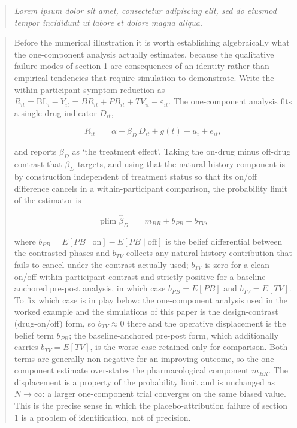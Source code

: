 \documentclass[
  11pt,
]{article}
\newenvironment{rgt}{%
  \begin{quote}\small\itshape\color[RGB]{20,60,160}}{%
  \end{quote}}
\newenvironment{orig}{%
  \begin{quote}\normalsize\color[gray]{0.55}}{%
  \end{quote}}
\begin{document}
\begin{rgt}
Lorem ipsum dolor sit amet, consectetur adipiscing elit, sed do eiusmod tempor incididunt ut labore et dolore magna aliqua.

\end{rgt}

\begin{orig}
Before the numerical illustration it is worth establishing
algebraically what the one-component analysis actually estimates,
because the qualitative failure modes of section 1 are
consequences of an identity rather than empirical tendencies that
require simulation to demonstrate. Write the within-participant
symptom reduction as
\(R_{it} = \mathrm{BL}_i - Y_{it} = BR_{it} + PB_{it} + TV_{it} -
\varepsilon_{it}\). The one-component analysis fits a single drug
indicator \(D_{it}\),

\[
R_{it} \;=\; \alpha + \beta_D\,D_{it} + g(t) + u_i + e_{it},
\]

and reports \(\hat\beta_D\) as `the treatment effect'. Taking the
on-drug minus off-drug contrast that \(\beta_D\) targets, and using
that the natural-history component is by construction independent
of treatment status so that its on/off difference cancels in a
within-participant comparison, the probability limit of the
estimator is

\[
\operatorname{plim}\hat\beta_D \;=\; m_{BR} + b_{PB} + b_{TV},
\]

where \(b_{PB} = E[PB \mid \text{on}] - E[PB \mid \text{off}]\) is
the belief differential between the contrasted phases and \(b_{TV}\)
collects any natural-history contribution that fails to cancel
under the contrast actually used; \(b_{TV}\) is zero for a clean
on/off within-participant contrast and strictly positive for a
baseline-anchored pre-post analysis, in which case
\(b_{PB} = E[PB]\) and \(b_{TV} = E[TV]\). To fix which case is in
play below: the one-component analysis used in the worked example
and the simulations of this paper is the design-contrast
(drug-on/off) form, so \(b_{TV} \approx 0\) there and the operative
displacement is the belief term \(b_{PB}\); the baseline-anchored
pre-post form, which additionally carries \(b_{TV} = E[TV]\), is the
worse case retained only for comparison. Both terms are generally
non-negative for an improving outcome, so the one-component estimate
over-states the pharmacological component \(m_{BR}\). The
displacement is a property of the probability limit and is
unchanged as \(N \to \infty\): a larger one-component trial
converges on the same biased value. This is the precise sense in
which the placebo-attribution failure of section 1 is a problem
of identification, not of precision.

\end{orig}
\end{document}
